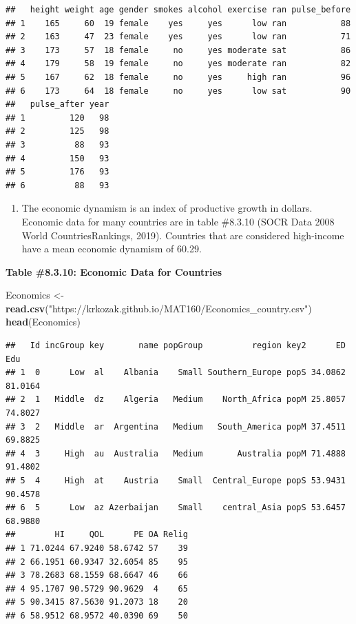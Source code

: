 \documentclass[]{book}
\newenvironment{Shaded}{\begin{snugshade}}{\end{snugshade}}
\newcommand{\KeywordTok}[1]{\textcolor[rgb]{0.13,0.29,0.53}{\textbf{#1}}}
\newcommand{\NormalTok}[1]{#1}
\newcommand{\StringTok}[1]{\textcolor[rgb]{0.31,0.60,0.02}{#1}}
\providecommand{\tightlist}{%
  \setlength{\itemsep}{0pt}\setlength{\parskip}{0pt}}
\begin{document}
\begin{verbatim}
##   height weight age gender smokes alcohol exercise ran pulse_before
## 1    165     60  19 female    yes     yes      low ran           88
## 2    163     47  23 female    yes     yes      low ran           71
## 3    173     57  18 female     no     yes moderate sat           86
## 4    179     58  19 female     no     yes moderate ran           82
## 5    167     62  18 female     no     yes     high ran           96
## 6    173     64  18 female     no     yes      low sat           90
##   pulse_after year
## 1         120   98
## 2         125   98
## 3          88   93
## 4         150   93
## 5         176   93
## 6          88   93
\end{verbatim}

\begin{enumerate}
\def\labelenumi{\arabic{enumi}.}
\setcounter{enumi}{4}
\tightlist
\item
  The economic dynamism is an index of productive growth in dollars. Economic data for many countries are in table \#8.3.10 (SOCR Data 2008 World CountriesRankings, 2019). Countries that are considered high-income have a mean economic dynamism of 60.29.
\end{enumerate}

\textbf{Table \#8.3.10: Economic Data for Countries}

\begin{Shaded}
\begin{Highlighting}[]
\NormalTok{Economics <-}\StringTok{ }\KeywordTok{read.csv}\NormalTok{(}\StringTok{"https://krkozak.github.io/MAT160/Economics_country.csv"}\NormalTok{)}
\KeywordTok{head}\NormalTok{(Economics)}
\end{Highlighting}
\end{Shaded}

\begin{verbatim}
##   Id incGroup key       name popGroup          region key2      ED     Edu
## 1  0      Low  al    Albania    Small Southern_Europe popS 34.0862 81.0164
## 2  1   Middle  dz    Algeria   Medium    North_Africa popM 25.8057 74.8027
## 3  2   Middle  ar  Argentina   Medium   South_America popM 37.4511 69.8825
## 4  3     High  au  Australia   Medium       Australia popM 71.4888 91.4802
## 5  4     High  at    Austria    Small  Central_Europe popS 53.9431 90.4578
## 6  5      Low  az Azerbaijan    Small    central_Asia popS 53.6457 68.9880
##        HI     QOL      PE OA Relig
## 1 71.0244 67.9240 58.6742 57    39
## 2 66.1951 60.9347 32.6054 85    95
## 3 78.2683 68.1559 68.6647 46    66
## 4 95.1707 90.5729 90.9629  4    65
## 5 90.3415 87.5630 91.2073 18    20
## 6 58.9512 68.9572 40.0390 69    50
\end{verbatim}
\end{document}
